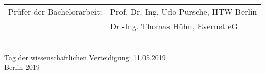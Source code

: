 \begin{titlepage}
\begin{center}
		\begin{tabular}{rl}
		Pr\"ufer der Bachelorarbeit:	& Prof. Dr.-Ing. Udo Pursche, HTW Berlin\\
						& Dr.-Ing. Thomas Hühn, Evernet eG\\
		\end{tabular}\\

    \vspace{2cm}
    \large Tag der wissenschaftlichen Verteidigung: 11.05.2019\\
    \vspace{0.5cm}
    \large Berlin 2019\\

  \end{center}
\end{titlepage}
